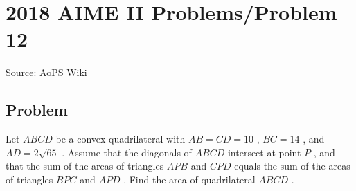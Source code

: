 \documentclass[12pt]{article}
\begin{document}
\section*{{2018 AIME II Problems/Problem 12}}
Source: AoPS Wiki

\subsection*{Problem}
Let $ABCD$ be a convex quadrilateral with $AB = CD = 10$ , $BC = 14$ , and $AD = 2\sqrt{65}$ . Assume that the diagonals of $ABCD$ intersect at point $P$ , and that the sum of the areas of triangles $APB$ and $CPD$ equals the sum of the areas of triangles $BPC$ and $APD$ . Find the area of quadrilateral $ABCD$ .
\end{document}
